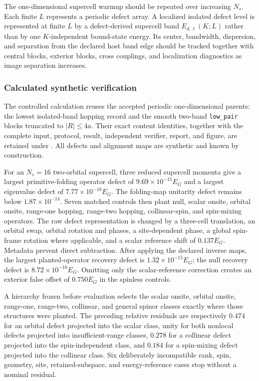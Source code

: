 The one-dimensional supercell warmup should be repeated over increasing
$N_s$. Each finite $L$ represents a periodic defect array. A localized isolated
defect level is represented at finite $L$ by a defect-derived supercell band
$E_{d,\ell}(K;L)$ rather than by one $K$-independent bound-state energy. Its
center, bandwidth, dispersion, and separation from the declared host band edge
should be tracked together with central blocks, exterior blocks, cross
couplings, and localization diagnostics as image separation increases.

\subsubsection{Calculated synthetic verification}

The controlled calculation reuses the accepted periodic one-dimensional
parents: the lowest isolated-band hopping record and the smooth two-band
\texttt{low\_pair} blocks truncated to $|R|\leq4a$. Their exact content
identities, together with the complete input, protocol, result, independent
verifier, report, and figure, are retained under
. All defects and
alignment maps are synthetic and known by construction.

For an $N_s=16$ two-orbital supercell, three reduced supercell momenta give a
largest primitive-folding operator defect of
$9.69\times10^{-15}E_G$ and a largest eigenvalue defect of
$7.77\times10^{-16}E_G$. The folding-map unitarity defect remains below
$1.87\times10^{-14}$. Seven matched controls then plant null, scalar onsite,
orbital onsite, range-one hopping, range-two hopping, collinear-spin, and
spin-mixing operators. The raw defect representation is changed by a
three-cell translation, an orbital swap, orbital rotation and phases, a
site-dependent phase,
a global spin-frame rotation where applicable, and a scalar reference shift of
$0.137E_G$. Metadata prevent direct subtraction. After applying the declared
inverse maps, the largest planted-operator recovery defect is
$1.32\times10^{-15}E_G$; the null recovery defect is
$8.72\times10^{-16}E_G$. Omitting only the scalar-reference correction creates
an exterior false offset of $0.750E_G$ in the spinless controls.

A hierarchy frozen before evaluation selects the scalar onsite, orbital onsite,
range-one, range-two, collinear, and general spinor classes exactly where those
structures were planted. The preceding relative residuals are respectively
$0.474$ for an orbital defect projected into the scalar class, unity for both
nonlocal defects projected into insufficient-range classes, $0.278$ for a
collinear defect projected into the spin-independent class, and $0.184$ for a
spin-mixing defect projected into the collinear class. Six deliberately
incompatible rank, spin, geometry, site, retained-subspace, and
energy-reference cases stop without a nominal residual.

